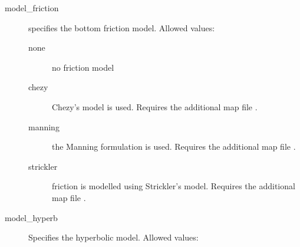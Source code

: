 \begin{description}
\item[model\_friction]  specifies the bottom friction model. Allowed values:
\begin{description}
    \item[none] no friction model
    \item[chezy]  Chezy's model is used. Requires the additional map file .
    \item[manning] the Manning formulation is used. Requires the additional map file .
    \item[strickler] friction is modelled using Strickler's model. Requires the additional map file .
\end{description}


\item[model\_hyperb] Specifies the hyperbolic model. Allowed values:
\begin{description}
   

\end{description}
\end{description}
